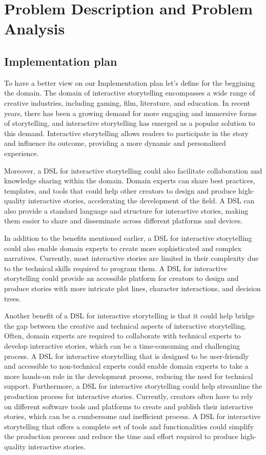 \chapter{Problem Description and Problem Analysis}

\section{Implementation plan}
To have a better view on our Implementation plan let's define for the beggining the domain.
The domain of interactive storytelling encompasses a wide range of creative industries, including gaming, film, literature, and education. In recent years, there has been a growing demand for more engaging and immersive forms of storytelling, and interactive storytelling has emerged as a popular solution to this demand. Interactive storytelling allows readers to participate in the story and influence its outcome, providing a more dynamic and personalized experience.


Moreover, a DSL for interactive storytelling could also facilitate collaboration and knowledge sharing within the domain. Domain experts can share best practices, templates, and tools that could help other creators to design and produce high-quality interactive stories, accelerating the development of the field. A DSL can also provide a standard language and structure for interactive stories, making them easier to share and disseminate across different platforms and devices.

In addition to the benefits mentioned earlier, a DSL for interactive storytelling could also enable domain experts to create more sophisticated and complex narratives. Currently, most interactive stories are limited in their complexity due to the technical skills required to program them. A DSL for interactive storytelling could provide an accessible platform for creators to design and produce stories with more intricate plot lines, character interactions, and decision trees.

Another benefit of a DSL for interactive storytelling is that it could help bridge the gap between the creative and technical aspects of interactive storytelling. Often, domain experts are required to collaborate with technical experts to develop interactive stories, which can be a time-consuming and challenging process. A DSL for interactive storytelling that is designed to be user-friendly and accessible to non-technical experts could enable domain experts to take a more hands-on role in the development process, reducing the need for technical support.
Furthermore, a DSL for interactive storytelling could help streamline the production process for interactive stories. Currently, creators often have to rely on different software tools and platforms to create and publish their interactive stories, which can be a cumbersome and inefficient process. A DSL for interactive storytelling that offers a complete set of tools and functionalities could simplify the production process and reduce the time and effort required to produce high-quality interactive stories.

